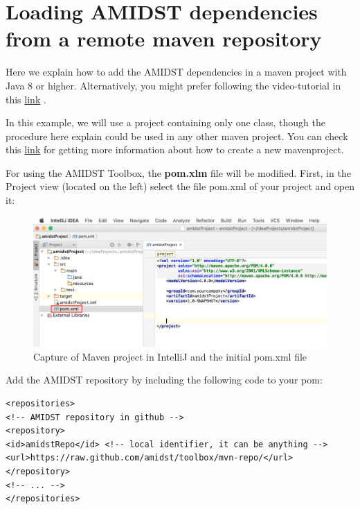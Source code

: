 \documentclass[10pt,a4paper]{article}
\begin{document}
	
	\section{Loading AMIDST dependencies from a remote maven repository}








Here we explain how to add the AMIDST dependencies in a maven project with Java 8 or higher.  Alternatively, you might prefer following the video-tutorial in this \href{https://www.youtube.com/watch?v=i_X6cFo91LE}{link} .\newline

In this example, we will use a  project containing only one class, though the procedure here explain  could be used in any other maven project. You can check this \href{https://www.jetbrains.com/help/idea/2016.1/getting-started-with-maven.html}{link} for getting more information about how to create a new mavenproject.\newline

For using the AMIDST Toolbox, the \textbf{pom.xlm} file will be modified. First, in the Project view (located on the left) select the file pom.xml of your project and open it:\newline


\begin{figure}[h!]
	\includegraphics[width=\linewidth]{img/use_amidst05.png}
	\caption{Capture of Maven project in IntelliJ  and the initial pom.xml file}
	\label{fig:remoteDeps_initialPom}	
\end{figure}



\noindent Add the AMIDST repository by including the following code to your
pom:\newline

\begin{verbatim}
<repositories>
<!-- AMIDST repository in github -->
<repository>
<id>amidstRepo</id> <!-- local identifier, it can be anything -->
<url>https://raw.github.com/amidst/toolbox/mvn-repo/</url>
</repository>
<!-- ... -->
</repositories>        
\end{verbatim}
\end{document}

